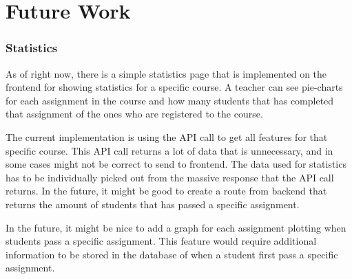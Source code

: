 \chapter{Future Work}
\subsection{Statistics}
As of right now, there is a simple statistics page that is implemented on the frontend for showing statistics for a specific course. A teacher can see pie-charts for each assignment in the course and how many students that has completed that assignment of the ones who are registered to the course.

The current implementation is using the API call to get all features for that specific course. This API call returns a lot of data that is unnecessary, and in some cases might not be correct to send to frontend. The data used for statistics has to be individually picked out from the massive response that the API call returns. In the future, it might be good to create a route from backend that returns the amount of students that has passed a specific assignment.

In the future, it might be nice to add a graph for each assignment plotting when students pass a specific assignment. This feature would require additional information to be stored in the database of when a student first pass a specific assignment.